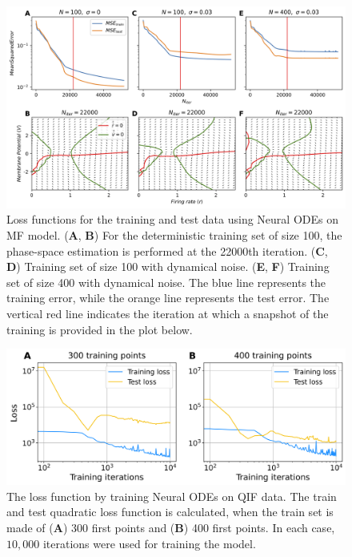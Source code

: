 \documentclass[preprint,11pt,authoryear]{elsarticle}
\begin{document}
\begin{figure}[ht]
    \centering
    \includegraphics[width=\linewidth]{Figs/FigS12.png}
    \renewcommand{\thefigure}{S\arabic{figure}}
    \caption{Loss functions for the training and test data using Neural ODEs on MF model. (\textbf{A}, \textbf{B}) For the deterministic training set of size 100, the phase-space estimation is performed at the 22000th iteration. (\textbf{C}, \textbf{D}) Training set of size 100 with dynamical noise. (\textbf{E}, \textbf{F}) Training set of size 400 with dynamical noise.  The blue line represents the training error, while the orange line represents the test error. The vertical red line indicates the iteration at which a snapshot of the training is provided in the plot below.}
    \label{fig:NeuralODEs_Fit_traces_MPR}
\end{figure}




\begin{figure}[ht]
    \centering
    \includegraphics[width=\linewidth]{Figs/FigS13.png}
    \renewcommand{\thefigure}{S\arabic{figure}}
    \caption{The loss function by training Neural ODEs on QIF data. The train and test quadratic loss function is calculated, when the train set is made of (\textbf{A}) 300 first points and (\textbf{B}) 400 first points. In each case, $10,000$ iterations were used for training the model.}
    \label{fig:NeuralODE_loss_QIF}
\end{figure}
\end{document}
